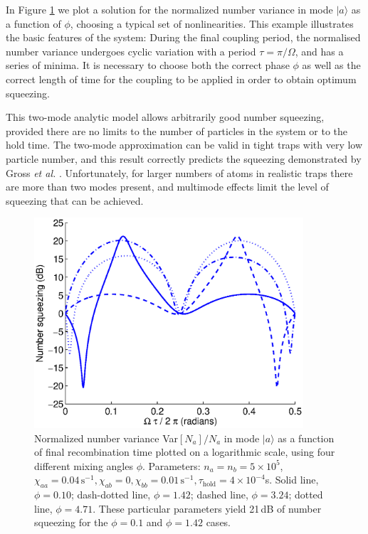 \documentclass{iopart}
\begin{document}

In Figure \ref{figTwoModeAnalyticExamples} we plot a solution for the normalized number variance in mode $|a\rangle$ as a function of $\phi$, choosing a typical set of nonlinearities. This example illustrates the basic features of the system: During the final coupling period, the normalised number variance undergoes cyclic variation with a period $\tau=\pi / \Omega$, and has a series of minima. It is necessary to choose both the correct phase $\phi$ as well as the correct length of time for the coupling to be applied in order to obtain optimum squeezing.

This two-mode analytic model allows arbitrarily good number squeezing, provided there are no limits to the number of particles in the system or to the hold time. The two-mode approximation can be valid in tight traps with very low particle number, and this result correctly predicts the squeezing demonstrated by Gross \textit{et al.} \cite{Gross2010}. Unfortunately, for larger numbers of atoms in realistic traps there are more than two modes present, and multimode effects limit the level of squeezing that can be achieved.

\begin{figure}
    \centering
    \includegraphics[width=10cm]{figures/analytic_two_mode_examples.eps}
    \caption{Normalized number variance Var$[N_a]/N_a$ in mode $|a \rangle$ as a function of final recombination time plotted on a logarithmic scale, using four different mixing angles $\phi$. Parameters: $n_a = n_b =5 \times 10^5$, $\chi_{aa}=0.04\, \text{s}^{-1}, \chi_{ab}=0, \chi_{bb}=0.01\,\text{s}^{-1}, \tau_{\mathrm{hold}}=4\times 10^{-4}$s. Solid line, $\phi=0.10$; dash-dotted line, $\phi=1.42$; dashed line, $\phi=3.24$; dotted line, $\phi=4.71$. These particular parameters yield 21\,dB of number squeezing for the $\phi=0.1$ and $\phi=1.42$ cases.} 
    \label{figTwoModeAnalyticExamples}
\end{figure}
\end{document}
